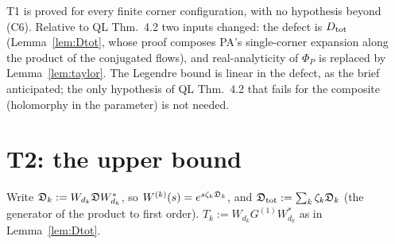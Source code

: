 \documentclass[11pt]{article}
\newcommand{\Dtot}{D_{\rm tot}}\newcommand{\Rp}{\mathsf R}\newcommand{\Lp}{\mathsf L}\newcommand{\Sch}{\mathcal S}
\theoremstyle{definition}\newtheorem{hypothesis}[theorem]{Hypothesis}
\begin{document}
\begin{verdictok}
T1 is proved for every finite corner configuration, with no hypothesis beyond (C6).  Relative to QL
Thm.~4.2 two inputs changed: the defect is $\Dtot$ (Lemma~\ref{lem:Dtot}, whose proof composes PA's
single-corner expansion along the product of the conjugated flows), and real-analyticity of $\Phi_P$ is
replaced by Lemma~\ref{lem:taylor}.  The Legendre bound is linear in the defect, as the brief anticipated;
the only hypothesis of QL Thm.~4.2 that fails for the composite (holomorphy in the parameter) is not needed.
\end{verdictok}

\section{T2: the upper bound}\label{sec:T2}
Write $\mathfrak D_k:=W_{d_k}\mathfrak D W_{d_k}^*$, so $W^{(k)}(s)=e^{s\zeta_k\mathfrak D_k}$, and $\mathfrak D_{\rm tot}:=\sum_k\zeta_k\mathfrak D_k$
(the generator of the product to first order).  $T_k:=W_{d_k}G^{(1)}W_{d_k}^*$ as in
Lemma~\ref{lem:Dtot}.
\end{document}
